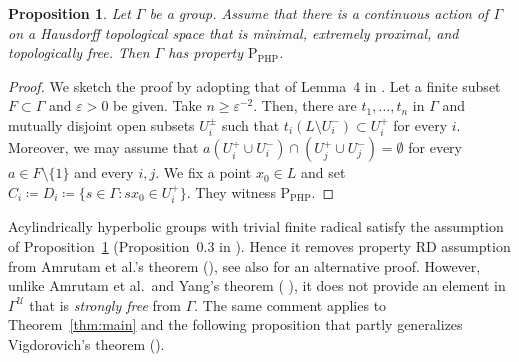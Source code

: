 \documentclass[12pt,nosumlimits,nonamelimits]{amsart}
\newtheorem{prop}[thm]{Proposition}
\theoremstyle{remark}
\theoremstyle{definition}
\newcommand{\cU}{\mathcal{U}}
\newcommand{\ve}{\varepsilon}
\newcommand{\Ga}{\Gamma}
\begin{document}
\begin{prop}\label{prop:dlh}
Let $\Ga$ be a group. Assume that there
is a continuous action of $\Ga$ on a Hausdorff topological space 
that is minimal, extremely proximal, and topologically free. 
Then $\Ga$ has property $\mathrm{P}_{\mathrm{PHP}}$.
\end{prop}
\begin{proof}
We sketch the proof by adopting that 
of Lemma~4 in \cite{delaharpe}. 
Let a finite subset $F\subset\Ga$ 
and $\ve>0$ be given. Take $n \geq \ve^{-2}$. 
Then, there are $t_1,\ldots,t_n$ in $\Ga$ and 
mutually disjoint open subsets $U_i^\pm$ 
such that $t_i (L\setminus U_i^-)\subset U_i^+$ for every $i$. 
Moreover, we may assume that 
$a(U_i^+\cup U_i^-)\cap (U_j^+\cup U_j^-)=\emptyset$ 
for every $a\in F\setminus\{1\}$ and every $i,j$.
We fix a point $x_0\in L$ and set 
$C_i \coloneq D_i \coloneq \{ s\in \Ga : sx_0\in U_i^+\}$. 
They witness $\mathrm{P}_{\mathrm{PHP}}$.
\end{proof}

Acylindrically hyperbolic groups with trivial 
finite radical satisfy the assumption of 
Proposition~\ref{prop:dlh} (Proposition~0.3 in \cite{ad}). 
Hence it removes property RD assumption from 
Amrutam et al.'s theorem (\cite{agkep}), 
see also \cite{yang} for an alternative proof. 
However, unlike Amrutam et al.\ and Yang's 
theorem (\cite{agkep} \cite{yang}), 
it does not provide an element in $\Ga^\cU$ 
that is \emph{strongly free} from $\Ga$. 
The same comment applies to Theorem~\ref{thm:main} 
and the following proposition that 
partly generalizes Vigdorovich's theorem (\cite{vigdorovich}).
\end{document}
